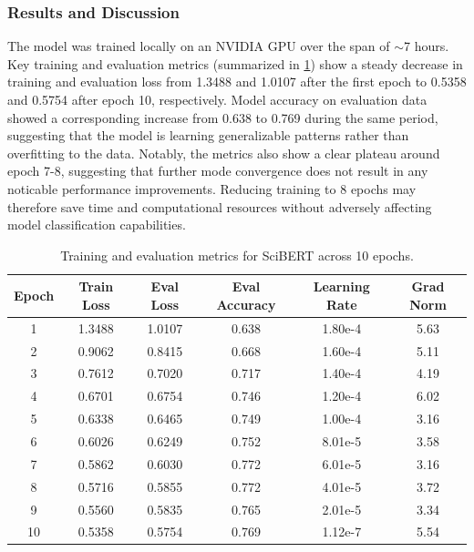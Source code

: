 \subsubsection{Results and Discussion}
The model was trained locally on an NVIDIA GPU over the span of $\sim$7 hours. Key training and evaluation metrics (summarized in \cref{tab:102}) show a steady decrease in training and evaluation loss from 1.3488 and 1.0107 after the first epoch to 0.5358 and 0.5754 after epoch 10, respectively. Model accuracy on evaluation data showed a corresponding increase from 0.638 to 0.769 during the same period, suggesting that the model is learning generalizable patterns rather than overfitting to the data. Notably, the metrics also show a clear plateau around epoch 7-8, suggesting that further mode convergence does not result in any noticable performance improvements. Reducing training to 8 epochs may therefore save time and computational resources without adversely affecting model classification capabilities.

\begin{table}[h!]
\centering
\begin{tabular}{|c|c|c|c|c|c|}
\hline
\textbf{Epoch} & \textbf{Train Loss} & \textbf{Eval Loss} & \textbf{Eval Accuracy} & \textbf{Learning Rate} & \textbf{Grad Norm} \\
\hline
1  & 1.3488 & 1.0107 & 0.638 & 1.80e-4 & 5.63 \\
2  & 0.9062 & 0.8415 & 0.668 & 1.60e-4 & 5.11 \\
3  & 0.7612 & 0.7020 & 0.717 & 1.40e-4 & 4.19 \\
4  & 0.6701 & 0.6754 & 0.746 & 1.20e-4 & 6.02 \\
5  & 0.6338 & 0.6465 & 0.749 & 1.00e-4 & 3.16 \\
6  & 0.6026 & 0.6249 & 0.752 & 8.01e-5 & 3.58 \\
7  & 0.5862 & 0.6030 & 0.772 & 6.01e-5 & 3.16 \\
8  & 0.5716 & 0.5855 & 0.772 & 4.01e-5 & 3.72 \\
9  & 0.5560 & 0.5835 & 0.765 & 2.01e-5 & 3.34 \\
10 & 0.5358 & 0.5754 & 0.769 & 1.12e-7 & 5.54 \\
\hline
\end{tabular}
\caption{Training and evaluation metrics for SciBERT across 10 epochs.}
\label{tab:102}
\end{table}

